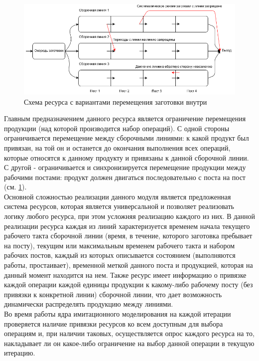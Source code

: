 \begin{figure}[hb!]
	\includegraphics[width=\linewidth]{pics/assemblyMain.png}
	\caption{Схема ресурса с вариантами перемещения заготовки внутри}
	\label{fig:assemblyMain}
\end{figure}

\indent Главным предназначением данного ресурса является ограничение перемещения продукции (над которой производится набор операций).
С одной стороны ограничивается перемещение между сборочными линиями: к какой продукт был привязан, на той он и останется до окончания выполнения всех операций, которые относятся к данному продукту и привязаны к данной сборочной линии.
С другой - ограничивается и синхронизируется перемещение продукции между рабочими постами: продукт должен двигаться последовательно с поста на пост (см. \ref{fig:assemblyMain}).\\
\indent Основной сложностью реализации данного модуля является предложенная система ресурсов, которая является универсальной и позволяет реализовать логику любого ресурса, при этом усложняя реализацию каждого из них.
В данной реализации ресурса каждая из линий характеризуется временем начала текущего рабочего такта сборочной линии (время, в течение, которого заготовка пребывает на посту), текущим или максимальным временем рабочего такта и набором рабочих постов, каждый из которых описывается состоянием (выполняются работы, простаивает), временной меткой данного поста и продукцией, которая на данный момент находится на нем.
Также ресурс имеет информацию о привязке каждой операции каждой единицы продукции к какому-либо рабочему посту (без привязки к конкретной линии) сборочной линии, что дает возможность динамически распределять продукцию между линиями.\\
\indent Во время работы ядра имитационного моделирования на каждой итерации проверяется наличие привязки ресурсов ко всем доступным для выбора операциям и, при наличии таковых, осуществляется опрос каждого ресурса на то, накладывает ли он какое-либо ограничение на выбор данной операции в текущую итерацию.


